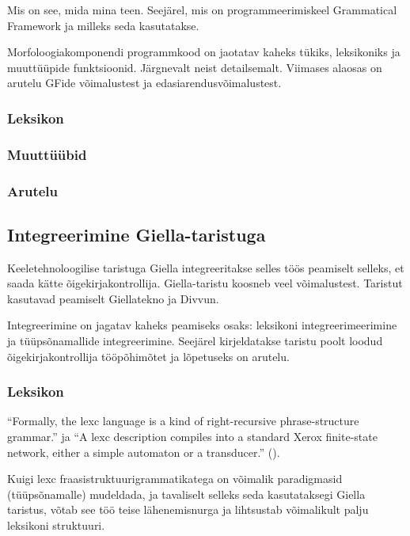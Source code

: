 \documentclass[12pt,a4paper]{article}
\begin{document}
Mis on see, mida mina teen. Seejärel, mis on programmeerimiskeel Grammatical Framework ja milleks seda kasutatakse.

Morfoloogiakomponendi programmkood on jaotatav kaheks tükiks, leksikoniks ja muuttüüpide funktsioonid. Järgnevalt neist detailsemalt. Viimases alaosas on arutelu GFide võimalustest ja edasiarendusvõimalustest.

\subsubsection{Leksikon}
\label{sec:gf-leksikon}

\subsubsection{Muuttüübid}
\label{sec:gf-muuttüübid}

\subsubsection{Arutelu}
\label{sec:gf-arutelu}






\subsection{Integreerimine Giella-taristuga}

Keeletehnoloogilise taristuga Giella integreeritakse selles töös peamiselt selleks, et saada kätte õigekirja\-kontrollija. Giella-taristu koosneb veel võimalustest. Taristut kasutavad peamiselt Giellatekno ja Divvun.

Integreerimine on jagatav kaheks peamiseks osaks: leksikoni integreerimeerimine ja tüüpsõnamallide integreerimine. Seejärel kirjeldatakse taristu poolt loodud õigekirjakontrollija tööpõhimõtet ja lõpetuseks on arutelu.

\subsubsection{Leksikon}
\label{sec:giella-leksikon}

``Formally, the lexc language is a kind of right-recursive phrase-structure 
grammar.'' ja ``A lexc description compiles into a standard Xerox finite-state network, either a simple automaton or a transducer.'' (\cite[lk~203]{beesley_finite_2003}).

Kuigi lexc fraasi\-struktuuri\-grammatikatega on võimalik paradigmasid (tüüpsõnamalle) mudeldada, ja tavaliselt selleks seda kasutataksegi Giella taristus, võtab see töö teise lähenemisnurga ja lihtsustab võimalikult palju leksikoni struktuuri.
\end{document}
